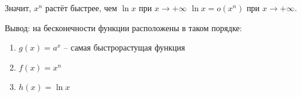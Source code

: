 Значит, $x^n$ растёт быстрее, чем  $\ln x$ при $x\to +\infty$ $\ln x = o(x^n)$ при $x \to  +\infty$.

Вывод: на бесконечности функции расположены в таком порядке:
\begin{enumerate}
  \item $g(x) = a^x$ -- самая быстрорастущая функция \\
  \item $f(x) = x^n$ \\
  \item $h(x) = \ln x$
\end{enumerate}


